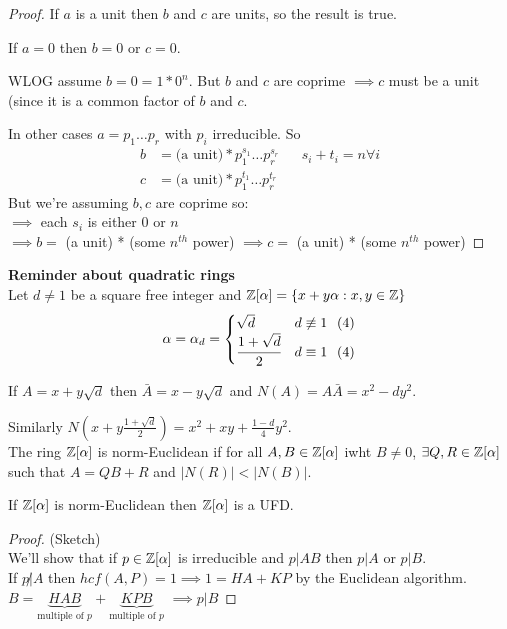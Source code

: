 \documentclass[11pt]{article}
\begin{document}
\begin{proof}
If $a$ is a unit then $b $ and $c$ are units, so the result is true.

If $a=0$ then $b=0$ or $c=0$.

WLOG assume $b=0 = 1*0^n$. 
	But $b$ and $c$ are coprime $\implies c$ must be a unit (since it is a common factor of $b$ and $c$.

	In other cases $a = p_1 \dots p_r $ with $p_i $ irreducible. 
	So 
	\begin{align*}
		b &=  \text{(a unit)} * p_1^{s_1} \dots p_r^{s_r} && s_i + t_i = n \forall i\\
		c &= \text{(a unit)} * p_1^{t_1} \dots p_r^{t_r} 
	\end{align*}
But we're assuming $b,c$ are coprime so:\\
$\implies $ each $s_i $ is either 0 or $n$ \\
	$\implies  b = $ (a unit) * (some $n^{th}$ power)  
	$\implies  c = $ (a unit) * (some $n^{th}$ power)  
\end{proof}
$ $\\
\textbf{Reminder about quadratic rings}\\
Let $d\neq 1$ be a square free integer and $\mathbb{Z}[\alpha] = \{ x+y\alpha : x,y \in \mathbb{Z} \}$
	\begin{equation*}
\alpha = \alpha_d = 
	\begin{cases}
		\sqrt{d} & d\not \equiv 1 \hspace{7pt} (4) \\
		\cfrac{1+\sqrt{d}}{2} & d \equiv 1 \hspace{7pt} (4)
	\end{cases}
	\end{equation*}

If $A = x+y\sqrt{d}$ then $\bar A = x-y \sqrt{d} $ and $N(A) = A \bar A = x^2 - dy^2 $.

Similarly $N(x+y\frac{1+\sqrt{d}}{2}) = x^2 +xy+ \frac{1-d}{4}y^2$.
$ $\\[1em]
The ring $\mathbb{Z}[\alpha]$ is norm-Euclidean if for all $A, B \in \mathbb{Z}[\alpha]$ iwht $B \neq 0$, $ \exists Q, R \in \mathbb{Z}[\alpha]$ such that $A=QB+R$ and $|N(R)| < |N(B)|$.

\begin{prop}
	If $\mathbb{Z}[\alpha]$ is norm-Euclidean then $\mathbb{Z}[\alpha]$ is a UFD.
\end{prop}
\begin{proof}
	(Sketch)\\
	We'll show that if $p \in \mathbb{Z}[\alpha]$ is irreducible and $p|AB$ then $p|A$ or $p|B$.\\
	If $p \not | A $ then $ hcf(A,P) = 1 \implies 1 = HA+KP$ by the Euclidean algorithm.\\
	$B = \underbrace{HAB}_\text{multiple of $p$} +\underbrace{KPB}_\text{multiple of $p$}$ $\implies p | B$
\end{proof}
\end{document}
